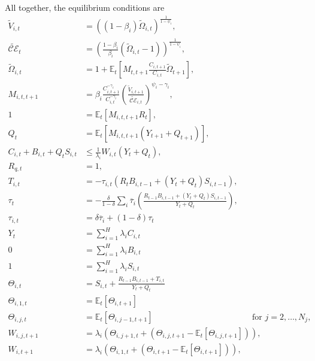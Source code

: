 \documentclass[12 pt, oneside]{article}
\theoremstyle{definition}
\theoremstyle{definition}
\theoremstyle{definition}
\newcommand{\E}{\mathbb{E}}
\newcommand{\calC}{\mathcal{C}}
\newcommand{\calE}{\mathcal{E}}
\begin{document}
All together, the equilibrium conditions are
\begin{align}
  \label{eq:epstein zin defn eqm}
  \tilde{V}_{i, t} & = ((1 - \beta_i)\tilde{\Omega}_{i, t})^{\frac{1}{1 - \psi_i}},\\
  \label{eq:certainty equivalent eqm}
  \tilde{\calC\calE}_t & = \left(\frac{1 - \beta_i}{\beta_i}(\tilde{\Omega}_{i, t} - 1)\right)^{\frac{1}{1 - \psi_i}},\\
  \label{eq:epstein zin wealth recursion eqm}
  \tilde{\Omega}_{i, t} & = 1 + \E_t\left[M_{t, t + 1}\frac{C_{i, t + 1}}{C_{i, t}}\tilde{\Omega}_{t + 1}\right],\\
  \label{eq:stochastic discount factor eqm}
  M_{i, t, t + 1} & = \beta_i \frac{C_{i, t + 1}^{- \gamma_i } }{C_{i, t}^{-\gamma_i}}\left(\frac{\tilde{V}_{i, t + 1}}{\tilde{\calC\calE}_{i, t}}\right)^{ \psi_i - \gamma_i},\\
  \label{eq:euler eqn eqm}
  1 & = \E_t\left[M_{i, t, t + 1}R_t\right],\\
  \label{eq:tree asset pricing eqm}
  Q_t & = \E_t\left[M_{i, t, t + 1} \left(Y_{t + 1} + Q_{t + 1}\right)\right],\\
  \label{eq:hh budget constraint with wealth share eqm}
  C_{i, t} + B_{i, t} + Q_t S_{i, t} & \leq \frac{1}{\lambda_i} W_{i, t} (Y_t +  Q_t),\\
  \label{eq:Rq defn eqm}
  R_{q, t} & = 1,\\
  \label{eq:net transfer rule eqm}
  T_{i, t} & = -\tau_{i, t}(R_t B_{i, t - 1} + (Y_t +  Q_t)S_{i, t - 1}),\\
  \label{eq:common tax rate eqm}
  \tau_t & = -\frac{\delta}{1 - \delta}\sum_i\overline{\tau}_i\left(\frac{R_{t - 1}B_{i, t - 1} + (Y_t + Q_t)S_{i, t - 1}}{Y_t + Q_t}\right),\\
  \label{eq:tax rate on type i eqm}
  \tau_{i, t} & = \delta\overline{\tau}_i + (1 - \delta)\tau_t\\
  \label{eq:consumption market clearing eqm}
  Y_t & = \sum_{i = 1}^H \lambda_i C_{i, t} \\
  \label{eq:bond market clearing eqm}
  0 & = \sum_{i = 1}^H \lambda_i B_{i, t}\\
  \label{eq:share market clearing eqm}
  1 & = \sum_{i = 1}^H \lambda_i S_{i, t} \\
  \label{eq:theta defn eqm}
  \Theta_{i, t} & = S_{i, t} + \frac{R_{t - 1} B_{i, t - 1} + T_{i, t}}{Y_t + Q_t}\\
  \label{eq:theta cond expectation 1 period defn eqm}
  \Theta_{i, 1, t} & = \E_t[\Theta_{i, t + 1}]\\
  \label{eq:theta cond expectation j period defn eqm}
  \Theta_{i, j, t} & = \E_t[\Theta_{i, j - 1, t + 1}] \quad\quad\quad\quad\quad\quad\quad\quad\quad\quad\quad\,\,\,\,\, \text{for }j = 2,\dots, N_j,\\
  \label{eq:wealth share cond expectation j period defn eqm}
  W_{i, j, t + 1} & = \lambda_i(\Theta_{i, j + 1, t} + (\Theta_{i, j, t + 1} - \E_t[\Theta_{i, j, t + 1}])),\\
  \label{eq:wealth share evolution eqm}
  W_{i, t + 1} & = \lambda_i(\Theta_{i, 1, t} + (\Theta_{i, t + 1} - \E_t[\Theta_{i, t + 1}])),
\end{align}
\end{document}
